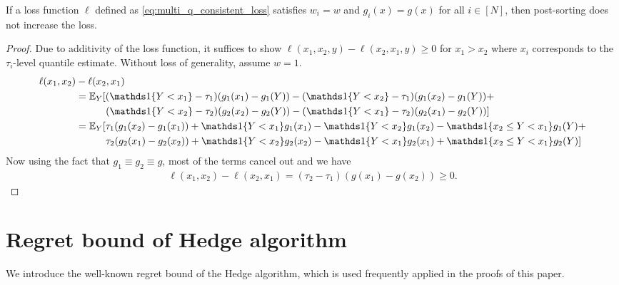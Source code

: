 \begin{prop}
If a loss function $\ell$ defined as \eqref{eq:multi_q_consistent_loss} satisfies $w_i = w$ and $g_i(x) = g(x)$ for all $i \in [N]$, then post-sorting does not increase the loss.
\end{prop}
\begin{proof}
Due to additivity of the loss function, it suffices to show $\ell(x_1, x_2, y) - \ell(x_2, x_1, y) \geq 0$ for $x_1 > x_2$ where $x_i$ corresponds to the $\tau_i$-level quantile estimate. Without loss of generality, assume $w=1$.
\begin{align*}
\ell(x_1, x_2) & - \ell(x_2, x_1) \\
& = \E_Y [ (\indi{Y < x_1} - \tau_1)(g_1(x_1) - g_1(Y)) - (\indi{Y < x_2} - \tau_1)(g_1(x_2) - g_1(Y)) + \\
& \quad \qquad (\indi{Y < x_2} - \tau_2)(g_2(x_2) - g_2(Y)) - (\indi{Y < x_1} - \tau_2)(g_2(x_1) - g_2(Y))] \\
& = \E_Y [\tau_1(g_1(x_2)-g_1(x_1)) + \indi{Y < x_1}g_1(x_1) - \indi{Y < x_2}g_1(x_2) - \indi{x_2 \leq Y < x_1}g_1(Y) + \\
& \quad \qquad \tau_2(g_2(x_1)-g_2(x_2)) + \indi{Y < x_2}g_2(x_2) - \indi{Y < x_1}g_2(x_1) + \indi{x_2 \leq Y < x_1}g_2(Y)]
\end{align*}
Now using the fact that $g_1 \equiv g_2 \equiv g$, most of the terms cancel out and we have 
\begin{align*}
\ell(x_1, x_2) - \ell(x_2, x_1) = (\tau_2 - \tau_1)(g(x_1) - g(x_2)) \geq 0.
\end{align*}
\end{proof}





\section{Regret bound of Hedge algorithm}
We introduce the well-known regret bound of the Hedge algorithm, which is used frequently applied in the proofs of this paper.

